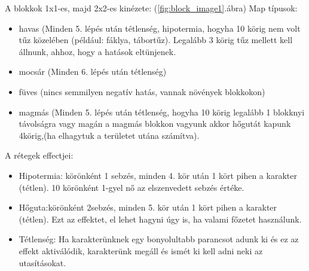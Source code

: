 A blokkok 1x1-es, majd 2x2-es kinézete:
(\ref{fig:block_image1}.ábra)
Map típusok:
\begin{itemize}
    \item havas (Minden 5. lépés után tétlenség, hipotermia, hogyha 10 körig nem volt tűz közelében (például: fáklya, tábortűz). Legalább 3 körig tűz mellett kell állnunk, ahhoz, hogy a hatások eltünjenek.
    \item mocsár (Minden 6. lépés után tétlenség)
    \item füves (nincs semmilyen negatív hatás, vannak növények blokkokon)
    \item magmás (Minden 5. lépés után tétlenség, hogyha 10 körig legalább 1 blokknyi távolságra vagy magán a magmás blokkon vagyunk akkor hőgutát kapunk 4körig,(ha elhagytuk a területet utána számítva).
\end{itemize}
A rétegek effectjei:
\begin{itemize}
  \item Hipotermia: körönként 1 sebzés, minden 4. kör után 1 kört pihen a karakter (tétlen). 10 körönként 1-gyel nő az elszenvedett sebzés értéke.
  \item Hőguta:körönként 2sebzés, minden 5. kör után 1 kört pihen a karakter (tétlen). Ezt az effektet, el lehet hagyni úgy is, ha valami főzetet használunk.
  \item Tétlenség: Ha karakterünknek egy bonyolultabb parancsot adunk ki és ez az effekt aktiválódik, karakterünk megáll és ismét ki kell adni neki az utasításokat.
\end{itemize}

